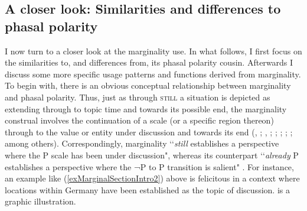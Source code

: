 \subsection[tocentry={}]{A closer look: Similarities and differences to phasal polarity} I now turn to a closer look at the marginality use. In what follows, I first focus on the similarities to, and differences from, its phasal polarity cousin. Afterwards I discuss some more specific usage patterns and functions derived from marginality. To begin with, there is an obvious conceptual relationship between marginality and phasal polarity. Thus, just as through \textsc{still} a situation is depicted as extending through to topic time and towards its possible end, the marginality construal involves the continuation of a scale (or a specific region thereon) through to the value or entity under discussion and towards its end (\cite{MosegaardHansen2002}, \citeyear[ch. 7]{MosegaardHansen2008}; \cite{Koenig1977}, \citeyear[ch. 7.4]{Koenig1991}; \cite{Liu2000}; \cite{Loebner1989}; \cite{Michaelis1993}; \cite{Yeh1998}; among others). Correspondingly, marginality \lq\lq \textit{still} establishes a perspective where the P scale has been under discussion", whereas its counterpart \lq\lq \textit{already} P establishes a perspective where the ¬P to P transition is salient" \parencite[25]{Ippolito2007}. For instance, an example like (\ref{exMarginalSectionIntro2}) above is felicitous in a context where locations within Germany have been established as the topic of discussion.  is a graphic illustration.	


